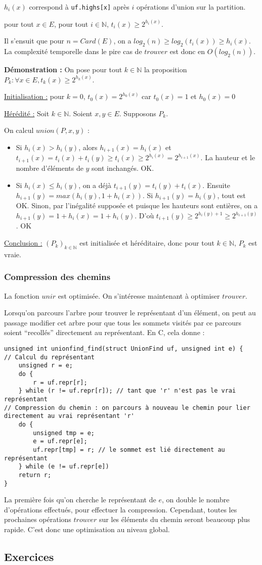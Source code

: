 \documentclass[../../../main.tex]{subfiles}
\begin{document}
$h_i(x)$ correspond à \texttt{uf.highs[x]} après $i$ opérations d'union sur la partition.

 pour tout $x\in E$, pour tout $i\in \mathbb{N}$, $t_i(x)\geq 2^{h_i(x)}$.

Il s'ensuit que pour $n = Card(E)$, on a $log_2(n) \geq log_2(t_i(x))\geq h_i(x)$. La complexité temporelle dans le pire cas de $trouver$ est donc en $O(log_2(n))$.

\textbf{Démonstration :} On pose pour tout $k\in\mathbb{N}$ la proposition $P_k : \forall x\in E, t_k(x)\geq 2^{h_k(x)}$.

\underline{Initialisation :} pour $k = 0$, $t_0(x) = 2^{h_0(x)}$ car $t_0(x) = 1$ et $h_0(x) = 0$

\underline{Hérédité :} Soit $k\in\mathbb{N}$. Soient $x, y\in E$. Supposons $P_k$.

On calcul $union(P, x, y)$ :
\begin{itemize}
	\item Si $h_i(x) > h_i(y)$, alors $h_{i+1}(x) = h_i(x)$ et $t_{i+1}(x) = t_i(x) + t_i(y) \geq t_i(x) \geq 2^{h_{i}(x)} = 2^{h_{i+1}(x)}$. La hauteur et le nombre d'éléments de $y$ sont inchangés. OK.
	\item Si $h_i(x) \leq h_i(y)$, on a déjà $t_{i+1}(y) = t_i(y) + t_i(x)$. Ensuite $h_{i+1}(y) = max(h_i(y), 1 + h_i(x))$. Si $h_{i+1}(y) = h_i(y)$, tout est OK. Sinon, par l'inégalité supposée et puisque les hauteurs sont entières, on a $h_{i+1}(y) = 1 + h_i(x) = 1 + h_i(y)$. D'où $t_{i+1}(y) \geq 2^{h_i(y) + 1}\geq 2^{h_{i+1}(y)}$ . OK
\end{itemize}

\underline{Conclusion :} $(P_k)_{k\in\mathbb{N}}$ est initialisée et héréditaire, donc pour tout $k\in\mathbb{N}$, $P_k$ est vraie.
\subsubsection{Compression des chemins}
La fonction $unir$ est optimisée. On s'intéresse maintenant à optimiser $trouver$. 

Lorsqu'on parcours l'arbre pour trouver le représentant d'un élément, on peut au passage modifier cet arbre pour que tous les sommets visités par ce parcours soient ``recollés'' directement au représentant. En C, cela donne :
\begin{verbatim}
unsigned int unionfind_find(struct UnionFind uf, unsigned int e) {
// Calcul du représentant
	unsigned r = e;
	do {
		r = uf.repr[r];
	} while (r != uf.repr[r]); // tant que 'r' n'est pas le vrai représentant
// Compression du chemin : on parcours à nouveau le chemin pour lier directement au vrai représentant 'r'
	do {
		unsigned tmp = e;
		e = uf.repr[e];
		uf.repr[tmp] = r; // le sommet est lié directement au représentant
	} while (e != uf.repr[e])
	return r;
}
\end{verbatim}
La première fois qu'on cherche le représentant de $e$, on double le nombre d'opérations effectués, pour effectuer la compression. Cependant, toutes les prochaines opérations $trouver$ sur les éléments du chemin seront beaucoup plus rapide. C'est donc une optimisation au niveau global.
\subsection{Exercices}
\end{document}
